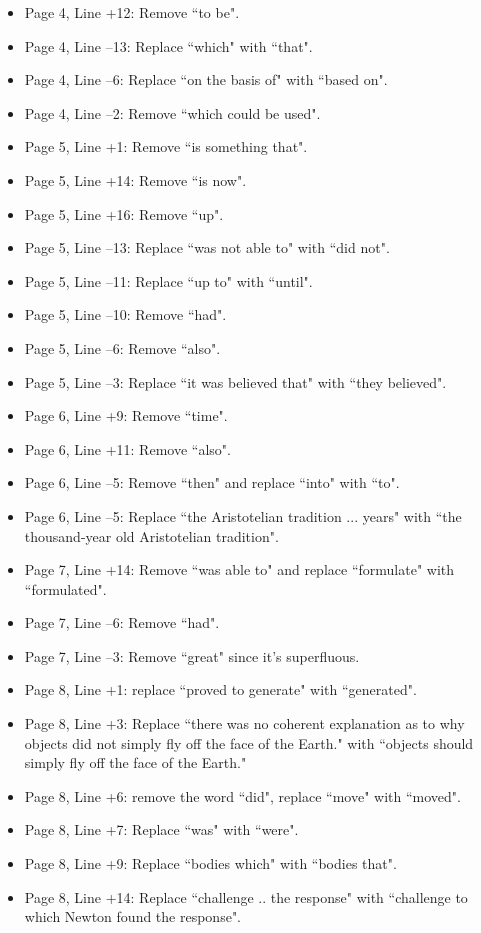 \documentclass[11pt]{article}
\begin{document}
\begin{itemize}
\begin{itemize}
		\item Page 4, Line +12: Remove ``to be".
		\item Page 4, Line --13: Replace ``which" with ``that".
		\item Page 4, Line --6: Replace ``on the basis of" with ``based on".
		\item Page 4, Line --2: Remove ``which could be used".
		\item Page 5, Line +1: Remove ``is something that".
		\item Page 5, Line +14: Remove ``is now".
		\item Page 5, Line +16: Remove ``up".
		\item Page 5, Line --13: Replace ``was not able to" with ``did not".
		\item Page 5, Line --11: Replace ``up to" with ``until".
		\item Page 5, Line --10: Remove ``had".
		\item Page 5, Line --6: Remove ``also".
		\item Page 5, Line --3: Replace ``it was believed that" with ``they believed".
		\item Page 6, Line +9: Remove ``time".
		\item Page 6, Line +11: Remove ``also".
		\item Page 6, Line --5: Remove ``then" and replace ``into" with ``to".
		\item Page 6, Line --5: Replace ``the Aristotelian tradition ... years" with ``the thousand-year old Aristotelian tradition".
		\item Page 7, Line +14: Remove ``was able to" and replace ``formulate" with ``formulated".
		\item Page 7, Line --6: Remove ``had".
		\item Page 7, Line --3: Remove ``great" since it's superfluous.
		\item Page 8, Line +1: replace ``proved to generate" with ``generated".
		\item Page 8, Line +3: Replace ``there was no coherent explanation as to why objects did not simply fly off the face of the Earth." with ``objects should simply fly off the face of the Earth."
		\item Page 8, Line +6: remove the word ``did", replace ``move" with ``moved".
		\item Page 8, Line +7: Replace ``was" with ``were".
		\item Page 8, Line +9: Replace ``bodies which" with ``bodies that".
		\item Page 8, Line +14: Replace ``challenge .. the response" with ``challenge to which Newton found the response".

\end{itemize}
\end{itemize}
\end{document}
